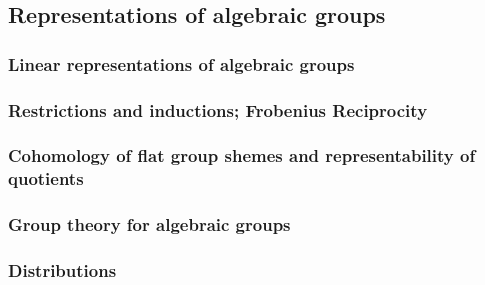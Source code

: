     \subsection{Representations of algebraic groups}
        \subsubsection{Linear representations of algebraic groups}
    
        \subsubsection{Restrictions and inductions; Frobenius Reciprocity}
        
        \subsubsection{Cohomology of flat group shemes and representability of quotients}
        
        \subsubsection{Group theory for algebraic groups}
        
        \subsubsection{Distributions}